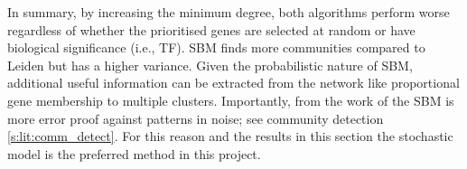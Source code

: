 In summary, by increasing the minimum degree, both algorithms perform worse regardless of whether the prioritised genes are selected at random or have biological significance (i.e., TF). SBM finds more communities compared to Leiden but has a higher variance. Given the probabilistic nature of SBM, additional useful information can be extracted from the network like proportional gene membership to multiple clusters. Importantly, from the work of \cite{Peixoto2023-se} the SBM is more error proof against patterns in noise; see community detection \cref{s:lit:comm_detect}. For this reason and the results in this section the stochastic model is the preferred method in this project.

